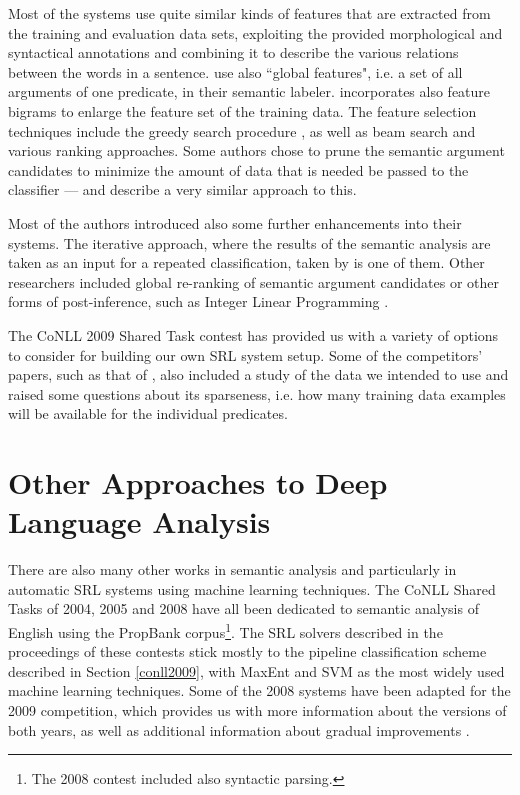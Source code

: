 \documentclass[12pt,notitlepage]{report}
\begin{document}
Most of the systems use quite similar kinds of features that are extracted from the training and evaluation data sets, exploiting the provided morphological and syntactical annotations and combining it to describe the various relations between the words in a sentence. \citet{asahara09} use also ``global features", i.e. a set of all arguments of one predicate, in their semantic labeler. \citet{nugues09} incorporates also feature bigrams to enlarge the feature set of the training data. The feature selection techniques include the greedy search procedure \citep[among others]{nugues09,zeman09}, as well as beam search \citep[][and others]{merlo09,nugues09} and various ranking approaches. Some authors chose to prune the semantic argument candidates to minimize the amount of data that is needed be passed to the classifier --- \citet{zhao09} and \citet{asahara09} describe a very similar approach to this.

Most of the authors introduced also some further enhancements into their systems. The iterative approach, where the results of the semantic analysis are taken as an input for a repeated classification, taken by \citet{chen09} is one of them. Other researchers included global re-ranking of semantic argument candidates \citep{nugues09} or other forms of post-inference, such as Integer Linear Programming \citep{che09}.

The CoNLL 2009 Shared Task contest has provided us with a variety of options to consider for building our own SRL system setup. Some of the competitors' papers, such as that of \citet{zeman09}, also included a study of the data we intended to use and raised some questions about its sparseness, i.e. how many training data examples will be available for the individual predicates.

\section{Other Approaches to Deep Language Analysis}

There are also many other works in semantic analysis and particularly in automatic SRL systems using machine learning techniques. The CoNLL Shared Tasks of 2004, 2005 \citep{carreras04,carreras05} and 2008 \citep{surdeanu08} have all been dedicated to semantic analysis of English using the PropBank corpus\footnote{The 2008 contest included also syntactic parsing.}. The SRL solvers described in the proceedings of these contests stick mostly to the pipeline classification scheme described in Section \ref{conll2009}, with MaxEnt and SVM as the most widely used machine learning techniques. Some of the 2008 systems have been adapted for the 2009 competition, which provides us with more information about the versions of both years, as well as additional information about gradual improvements \citep{che08,chen08}.
\end{document}
